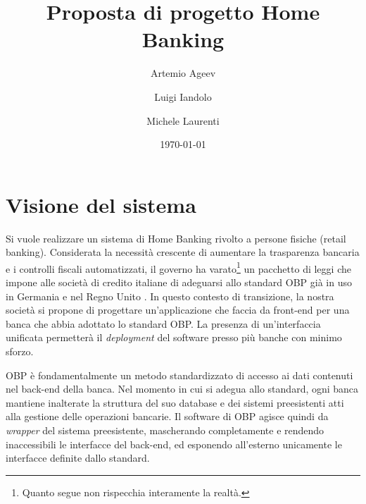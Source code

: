 \documentclass[]{softeng}
\author{Artemio Ageev \and Luigi Iandolo \and Michele Laurenti}
\title{Proposta di progetto Home Banking}
\date{\today}
\begin{document}
\maketitle

\section{Visione del sistema}

Si vuole realizzare un sistema di Home Banking rivolto a persone fisiche (retail banking).
Considerata la necessit\`a crescente di aumentare la trasparenza bancaria e i controlli fiscali automatizzati, il governo ha varato\footnote{Quanto segue non rispecchia interamente la realt\`a.} un pacchetto di leggi che impone alle societ\`a di credito italiane di adeguarsi allo standard OBP \cite{obp} gi\`a in uso in Germania e nel Regno Unito \cite{obpuk}.
In questo contesto di transizione, la nostra societ\`a si propone di progettare un'applicazione che faccia da front-end per una banca che abbia adottato lo standard OBP.
La presenza di un'interfaccia unificata permetter\`a il \emph{deployment} del software presso pi\`u banche con minimo sforzo.

OBP \`e fondamentalmente un metodo standardizzato di accesso ai dati contenuti nel back-end della banca.
Nel momento in cui si adegua allo standard, ogni banca mantiene inalterate la struttura del suo database e dei sistemi preesistenti atti alla gestione delle operazioni bancarie.
Il software di OBP agisce quindi da \emph{wrapper} del sistema preesistente, mascherando completamente e rendendo inaccessibili le interfacce del back-end, ed esponendo all'esterno unicamente le interfacce definite dallo standard.
\end{document}
